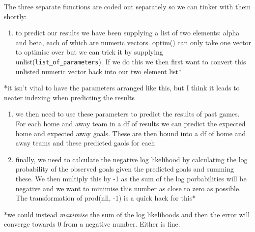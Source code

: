 \documentclass[]{article}
\providecommand{\tightlist}{%
  \setlength{\itemsep}{0pt}\setlength{\parskip}{0pt}}
\begin{document}
The three separate functions are coded out separately so we can tinker
with them shortly:

\begin{enumerate}
\def\labelenumi{\arabic{enumi})}
\tightlist
\item
  to predict our results we have been supplying a list of two elements:
  alpha and beta, each of which are numeric vectors. optim() can only
  take one vector to optimise over but we can trick it by supplying
  unlist(\texttt{list\_of\_parameters}). If we do this we then first
  want to convert this unlisted numeric vector back into our two element
  list*
\end{enumerate}

*it isn't vital to have the parameters arranged like this, but I think
it leads to neater indexing when predicting the results

\begin{enumerate}
\def\labelenumi{\arabic{enumi})}
\setcounter{enumi}{1}
\item
  we then need to use these parameters to predict the results of past
  games. For each home and away team in a df of results we can predict
  the expected home and expected away goals. These are then bound into a
  df of home and away teams and these predicted gaols for each
\item
  finally, we need to calculate the negative log likelihood by
  calculating the log probability of the observed goals given the
  predicted goals and summing these. We then multiply this by -1 as the
  sum of the log porbabilities will be negative and we want to minimise
  this number as close to zero as possible. The transformation of
  prod(nll, -1) is a quick hack for this*
\end{enumerate}

*we could instead \emph{maximise} the sum of the log likelihoods and
then the error will converge towards 0 from a negative number. Either is
fine.
\end{document}
